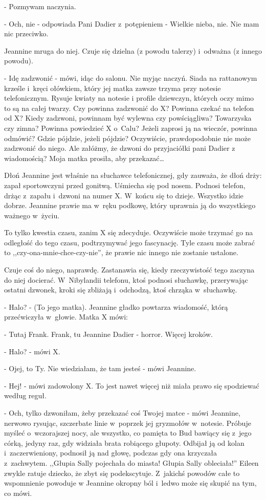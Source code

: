 \documentclass[oneside,polish,12pt,sfheadings]{mwbk}
\begin{document}
- Pozmywam naczynia.

- Och, nie - odpowiada Pani Dadier z~potępieniem - Wielkie nieba,
nie. Nie mam nic przeciwko.

Jeannine mruga do niej. Czuje się dzielna (z powodu talerzy) i~odważna
(z innego powodu). 

- Idę zadzwonić - mówi, idąc do salonu. Nie myjąc
naczyń. Siada na rattanowym krześle i~kręci ołówkiem, który jej matka
zawsze trzyma przy notesie telefonicznym. Rysuje kwiaty na notesie
i profile dziewczyn, których oczy mimo to są na całej twarzy. Czy
powinna zadzwonić do X? Powinna czekać na telefon od X? Kiedy zadzwoni,
powinnam być wylewna czy powściągliwa? Towarzyska czy zimna? Powinna
powiedzieć X o~Calu? Jeżeli zaprosi ją na wieczór, powinna odmówić?
Gdzie pójdzie, jeżeli pójdzie? Oczywiście, prawdopodobnie nie może
zadzwonić do niego. Ale załóżmy, że dzwoni do przyjaciółki pani Dadier
z wiadomością? Moja matka prosiła, aby przekazać\ldots

Dłoń Jeannine jest właśnie na słuchawce telefonicznej, gdy zauważa,
że dłoń drży: zapał sportowczyni przed gonitwą. Uśmiecha się pod nosem.
Podnosi telefon, drżąc z~zapału i~dzwoni na numer X. W~końcu się to
dzieje. Wszystko idzie dobrze. Jeannine prawie ma w~ręku podkowę,
który uprawnia ją do wszystkiego ważnego w~życiu.

To tylko kwestia czasu, zanim X się zdecyduje. Oczywiście może trzymać
go na odległość do tego czasu, podtrzymywać jego fascynację. Tyle
czasu może zabrać to ,,czy-ona-mnie-chce-czy-nie'', że prawie nic
innego nie zostanie ustalone.

Czuje coś do niego, naprawdę. Zastanawia się, kiedy rzeczywistość
tego zaczyna do niej docierać. W~Nibylandii telefonu, ktoś podnosi
słuchawkę, przerywając ostatni dzwonek, kroki się zbliżają i~odchodzą,
ktoś chrząka w~słuchawkę.

- Halo? - (To jego matka). Jeannine gładko powtarza wiadomość, którą
przećwiczyła w~głowie. Matka X mówi: 

- Tutaj Frank. Frank, tu Jeannine Dadier - horror. Więcej kroków.

- Halo? - mówi X.

- Ojej, to Ty. Nie wiedziałam, że tam jesteś - mówi Jeannine.

- Hej! - mówi zadowolony X. To jest nawet więcej niż miała prawo się
spodziewać według reguł.

- Och, tylko dzwoniłam, żeby przekazać coś Twojej matce - mówi Jeannine,
nerwowo rysując, szczerbate linie w~poprzek jej gryzmołów w~notesie.
Próbuje myśleć o~wczorajszej nocy, ale wszystko, co pamięta to Bud
bawiący się z~jego córką, jedyny raz, gdy widziała brata robiącego
głupoty. Odbijał ją od kolan i~zaczerwieniony, podnosił ją nad głowę,
podczas gdy ona krzyczała z~zachwytem. ,,Głupia Sally pojechała do
miasta! Głupia Sally obleciała!'' Eileen zwykle ratuje dziecko, że
zbyt się podekscytuje. Z~jakichś powodów całe to wspomnienie powoduje
w Jeannine okropny ból i~ledwo może się skupić na tym, co mówi.
\end{document}
